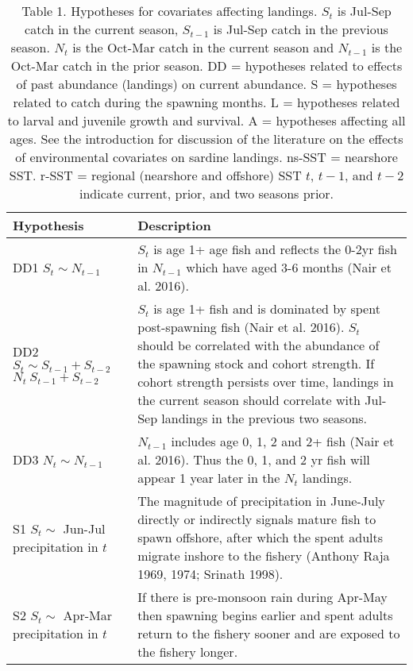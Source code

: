 
\begin{table}

\caption{\label{tab:print-table-hyp}Table 1. Hypotheses for covariates affecting landings.  $S_t$ is Jul-Sep catch in the current season, $S_{t-1}$ is Jul-Sep catch in the previous season. $N_t$ is the Oct-Mar catch in the current season and $N_{t-1}$ is the Oct-Mar catch in the prior season. DD = hypotheses related to effects of past abundance (landings) on current abundance. S = hypotheses related to catch during the spawning months. L = hypotheses related to larval and juvenile growth and survival. A = hypotheses affecting all ages. See the introduction for discussion of the literature on the effects of environmental covariates on sardine landings. ns-SST = nearshore SST. r-SST = regional (nearshore and offshore) SST $t$, $t-1$, and $t-2$ indicate current, prior, and two seasons prior.}
\centering
\begin{tabular}[t]{>{\raggedright\arraybackslash}p{5.5cm}|>{\raggedright\arraybackslash}p{10cm}}
\hline
Hypothesis & Description\\
\hline
DD1 \newline $S_t \sim N_{t-1}$ & $S_t$ is age 1+ age fish and reflects the 0-2yr fish in $N_{t-1}$ which have aged 3-6 months (Nair et al. 2016).\\
\hline
DD2 \newline $S_t \sim S_{t-1} + S_{t-2}$ 
 $N_t ~ S_{t-1} + S_{t-2}$ & $S_t$ is age 1+ fish and is dominated by spent post-spawning fish (Nair et al. 2016). $S_t$ should be correlated with the abundance of the spawning stock and cohort strength. If cohort strength persists over time, landings in the current season should correlate with Jul-Sep landings in the previous two seasons.\\
\hline
DD3 \newline $N_t \sim N_{t-1}$ & $N_{t-1}$ includes age 0, 1, 2 and 2+ fish (Nair et al. 2016). Thus the 0, 1, and 2 yr fish will appear 1 year later in the $N_t$ landings.\\
\hline
S1 \newline $S_t \sim$ Jun-Jul precipitation in $t$ & The magnitude of precipitation in June-July directly or indirectly signals mature fish to spawn offshore, after which the spent adults migrate inshore to the fishery (Anthony Raja 1969, 1974; Srinath 1998).\\
\hline
S2 \newline $S_t \sim$ Apr-Mar precipitation in $t$ & If there is pre-monsoon rain during Apr-May then spawning begins earlier and spent adults return to the fishery sooner and are exposed to the fishery longer.\\

\end{tabular}
\end{table}
